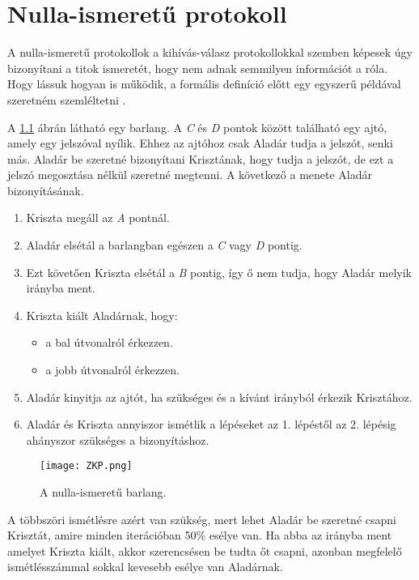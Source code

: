 \chapter{Nulla-ismeretű protokoll}

A nulla-ismeretű protokollok a kihívás-válasz protokollokkal szemben képesek úgy bizonyítani a titok ismeretét, hogy nem adnak semmilyen információt a róla. Hogy lássuk hogyan is működik, a formális definíció előtt egy egyszerű példával szeretném szemléltetni \cite{ZKPToYourChildren, schneier2015applied}.

A \ref{Figure::ZKcave} ábrán látható egy barlang. A \textit{C} és \textit{D} pontok között található egy ajtó, amely egy jelszóval nyílik. Ehhez az ajtóhoz csak Aladár tudja a jelszót, senki más. Aladár be szeretné bizonyítani Krisztának, hogy tudja a jelszót, de ezt a jelszó megosztása nélkül szeretné megtenni. A következő a menete Aladár bizonyításának.

\begin{enumerate}
    \item Kriszta megáll az \textit{A} pontnál.
    \item Aladár elsétál a barlangban egészen a \textit{C} vagy \textit{D} pontig.
    \item Ezt követően Kriszta elsétál a \textit{B} pontig, így ő nem tudja, hogy Aladár melyik irányba ment.
    \item Kriszta kiált Aladárnak, hogy:
        \begin{itemize}
            \item a bal útvonalról érkezzen.
            \item a jobb útvonalról érkezzen.
        \end{itemize}
    \item Aladár kinyitja az ajtót, ha szükséges és a kívánt irányból érkezik Krisztához.
    \item Aladár és Kriszta annyiszor ismétlik a lépéseket az 1. lépéstől az 2. lépésig ahányszor szükséges a bizonyításhoz.
\end{enumerate}

\begin{figure}[H]
    \centering
    \texttt{[image: ZKP.png]}
    \caption{A nulla-ismeretű barlang.}
    \label{Figure::ZKcave}
\end{figure}

A többszöri ismétlésre azért van szükség, mert lehet Aladár be szeretné csapni Krisztát, amire minden iterációban 50\% esélye van. Ha abba az irányba ment amelyet Kriszta kiált, akkor szerencsésen be tudta őt csapni, azonban megfelelő ismétlésszámmal sokkal kevesebb esélye van Aladárnak.

